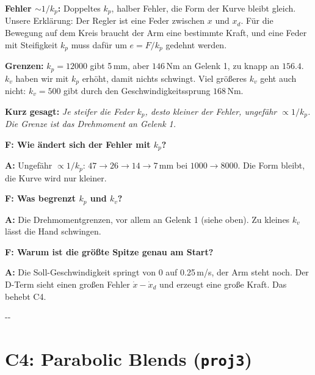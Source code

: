 \documentclass[10pt,a4paper]{article}
\makeatletter
\newcommand{\secneed}[1]{\par\penalty\@M\begingroup\setlength{\dimen@}{#1}\dimen@ii\pagegoal
  \advance\dimen@ii-\pagetotal\ifdim\dimen@>\dimen@ii\ifdim\dimen@ii>\z@\vfil\fi\penalty-\@M\fi\endgroup}
\let\oldsection\section
\renewcommand{\section}{\secneed{9\baselineskip}\oldsection}
\newcommand{\frage}[2]{\textbf{F: #1}\par\nopagebreak\vspace{1pt}\textbf{A:} #2\par\vspace{5pt}}
\newcommand{\sagen}[1]{\textbf{Kurz gesagt:} \emph{#1}\par}
\newcommand{\code}[1]{\texttt{#1}}
\makeatother
\begin{document}
\textbf{Fehler $\sim 1/k_p$:} Doppeltes $k_p$, halber Fehler, die Form der Kurve bleibt gleich. Unsere Erklärung: Der Regler
ist eine Feder zwischen $x$ und $x_d$. Für die Bewegung auf dem Kreis braucht der Arm eine bestimmte Kraft, und eine Feder
mit Steifigkeit $k_p$ muss dafür um $e = F/k_p$ gedehnt werden.

\textbf{Grenzen:} $k_p = 12000$ gibt 5\,mm, aber $146$\,Nm an Gelenk 1, zu knapp an $156.4$. $k_v$ haben wir mit $k_p$
erhöht, damit nichts schwingt. Viel größeres $k_v$ geht auch nicht: $k_v = 500$ gibt durch den Geschwindigkeitssprung
$168$\,Nm.

\sagen{Je steifer die Feder $k_p$, desto kleiner der Fehler, ungefähr $\propto 1/k_p$. Die Grenze ist das Drehmoment an
Gelenk 1.}

\begin{fragen}
\frage{Wie ändert sich der Fehler mit $k_p$?}
{Ungefähr $\propto 1/k_p$: $47 \to 26 \to 14 \to 7$\,mm bei $1000 \to 8000$. Die Form bleibt, die Kurve wird nur kleiner.}
\frage{Was begrenzt $k_p$ und $k_v$?}
{Die Drehmomentgrenzen, vor allem an Gelenk 1 (siehe oben). Zu kleines $k_v$ lässt die Hand schwingen.}
\frage{Warum ist die größte Spitze genau am Start?}
{Die Soll-Geschwindigkeit springt von 0 auf 0.25\,m/s, der Arm steht noch. Der D-Term sieht einen großen Fehler
$\dot x - \dot x_d$ und erzeugt eine große Kraft. Das behebt C4.}
\end{fragen}

\section{C4: Parabolic Blends (\code{proj3})}
\end{document}
